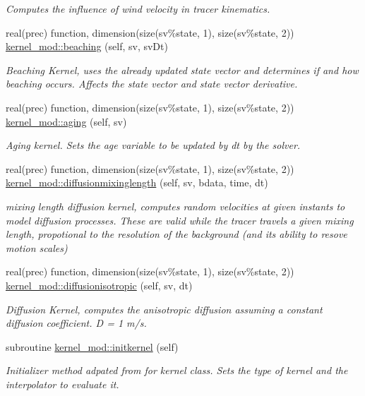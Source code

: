 \begin{DoxyCompactItemize}
\begin{DoxyCompactList}\small\item\em Computes the influence of wind velocity in tracer kinematics. \end{DoxyCompactList}\item 
real(prec) function, dimension(size(sv\%state, 1), size(sv\%state, 2)) \mbox{\hyperlink{namespacekernel__mod_ad243eaeb4e5d667795477e81ce6136c9}{kernel\+\_\+mod\+::beaching}} (self, sv, sv\+Dt)
\begin{DoxyCompactList}\small\item\em Beaching Kernel, uses the already updated state vector and determines if and how beaching occurs. Affects the state vector and state vector derivative. \end{DoxyCompactList}\item 
real(prec) function, dimension(size(sv\%state, 1), size(sv\%state, 2)) \mbox{\hyperlink{namespacekernel__mod_ac2352f3964b072607ed042e70a59b9f2}{kernel\+\_\+mod\+::aging}} (self, sv)
\begin{DoxyCompactList}\small\item\em Aging kernel. Sets the age variable to be updated by dt by the solver. \end{DoxyCompactList}\item 
real(prec) function, dimension(size(sv\%state, 1), size(sv\%state, 2)) \mbox{\hyperlink{namespacekernel__mod_a065d7965d3a572a524cfd6bdd4729898}{kernel\+\_\+mod\+::diffusionmixinglength}} (self, sv, bdata, time, dt)
\begin{DoxyCompactList}\small\item\em mixing length diffusion kernel, computes random velocities at given instants to model diffusion processes. These are valid while the tracer travels a given mixing length, propotional to the resolution of the background (and its ability to resove motion scales) \end{DoxyCompactList}\item 
real(prec) function, dimension(size(sv\%state, 1), size(sv\%state, 2)) \mbox{\hyperlink{namespacekernel__mod_a92805ef71e30527b27de4efd7561f8f7}{kernel\+\_\+mod\+::diffusionisotropic}} (self, sv, dt)
\begin{DoxyCompactList}\small\item\em Diffusion Kernel, computes the anisotropic diffusion assuming a constant diffusion coefficient. D = 1 m/s. \end{DoxyCompactList}\item 
subroutine \mbox{\hyperlink{namespacekernel__mod_a26c62a8eec723402e20142e68ba7ec65}{kernel\+\_\+mod\+::initkernel}} (self)
\begin{DoxyCompactList}\small\item\em Initializer method adpated from for kernel class. Sets the type of kernel and the interpolator to evaluate it. \end{DoxyCompactList}\end{DoxyCompactItemize}
